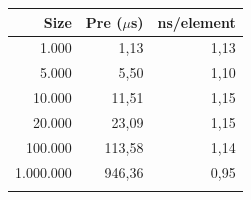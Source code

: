 \small
\begin{tabular*}{\columnwidth}{@{\extracolsep\fill}rrr@{\extracolsep\fill}}
\toprule
Size & Pre ($\mu$s) & ns/element\\
\midrule
1.000 & 1,13 & 1,13 \\
5.000 & 5,50 & 1,10 \\
10.000 & 11,51 & 1,15 \\
20.000 & 23,09 & 1,15 \\
100.000 & 113,58 & 1,14 \\
1.000.000 & 946,36 & 0,95 \\
\botrule
\end{tabular*}
